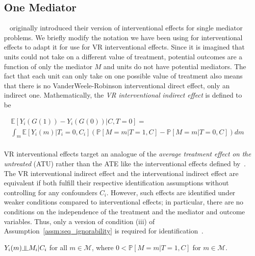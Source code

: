 \subsection{One Mediator}\label{subsection:vr_effects_1m}

~\cite{vanderweelerobinson2014} originally introduced their version of interventional effects for single
mediator problems. 
We briefly modify the notation we have been using for interventional effects to adapt it for use
for VR interventional effects. Since it is imagined that units could not take on a different value of 
treatment, potential outcomes are a function of only the mediator $M$ and units do not have potential mediators. 
The fact that each unit
can only take on one possible value of treatment also means that there is no VanderWeele-Robinson 
interventional direct effect,
only an indirect one. Mathematically, the \textit{VR interventional indirect effect} is defined to be

\begin{equation}\label{eq:g_formula_vr_1m}
\begin{aligned}
 \mathbb{E}[Y_{i}(G(1)) - Y_{i}(G(0))|C, T = 0] = \\
	\int_{m} \mathbb{E}[Y_{i}(m)|T_{i} = 0, C_{i}]
	(\mathbb{P}[M = m|T = 1, C] - \mathbb{P}[M = m|T = 0, C])dm\\
\end{aligned}
\end{equation}

VR interventional effects target an analogue of the \textit{average treatment effect on the untreated} (ATU)
rather than the ATE like the interventional effects defined by~\cite{vanderweeleetal2014}. The 
VR interventional indirect effect and the interventional indirect effect are equivalent if both fulfill 
their respective identification assumptions without controlling for any confounders $C_{i}$. 
However, such effects
are identified under weaker conditions compared to interventional effects; in particular, there are 
no conditions on the independence of the treatment and the mediator and outcome variables. Thus, only
a version of condition (iii) of Assumption~\ref{assm:seq_ignorability} is required for 
identification~\citep{jacksonvanderweele2018}.

\begin{assumption}\label{assm:seq_ignorability_vr_effects} 
\indent
$Y_{i}(m) \indep M_{i} | C_{i}$ for all $m \in \mathcal{M}$, 
where $0 < \mathbb{P}[M = m | T = 1, C]$
for $m \in \mathcal{M}$. 
\end{assumption}

